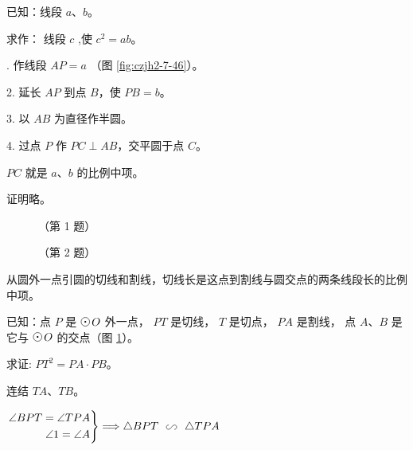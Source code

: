 \liti 已知：线段 $a$、$b$。

求作： 线段 $c$ ,使 $c^2 = ab$。

. 作线段 $AP=a$ （图 \ref{fig:czjh2-7-46}）。

2. 延长 $AP$ 到点 $B$，使 $PB = b$。

3. 以 $AB$ 为直径作半圆。

4. 过点 $P$ 作 $PC \perp AB$，交平圆于点 $C$。

$PC$ 就是 $a$、$b$ 的比例中项。

证明略。


\begin{lianxi}



\end{lianxi}

\begin{figure}[htbp]
    \centering
    \begin{minipage}[b]{4cm}
        \centering
        
        \caption*{（第 1 题）}
    \end{minipage}
    \qquad
    \begin{minipage}[b]{4.5cm}
        \centering
        
        \caption*{（第 2 题）}
    \end{minipage}
    \qquad
    \begin{minipage}[b]{6.0cm}
        \centering
        
        \caption{}\label{fig:czjh2-7-47}
    \end{minipage}
\end{figure}


\hspace{1em}

\begin{dingli}[切割线定理]
    从圆外一点引圆的切线和割线，切线长是这点到割线与圆交点的两条线段长的比例中项。
\end{dingli}


已知：点 $P$ 是 $\yuan\,O$ 外一点， $PT$ 是切线， $T$ 是切点，
$PA$ 是割线， 点 $A$、$B$ 是它与 $\yuan\,O$ 的交点（图 \ref{fig:czjh2-7-47}）。

求证: $PT^2 = PA \cdot PB$。

\zhengming 连结 $TA$、$TB$。

$\left.\begin{aligned}
    \angle BPT = \angle TPA \\
    \angle 1 = \angle A
\end{aligned}\right\}  \tuichu  \triangle BPT \xiangsi \triangle TPA$

